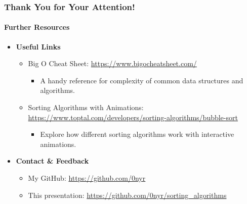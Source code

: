\documentclass[compress,12pt,bookmark]{beamer}
\begin{document}
\begin{frame}
    \frametitle{Thank You for Your Attention!}
    \framesubtitle{Further Resources}

    \begin{itemize}
        \item \textbf{Useful Links}
              \begin{itemize}
                  \item Big O Cheat Sheet: \url{https://www.bigocheatsheet.com/}
                        \begin{itemize}
                            \item A handy reference for complexity of common data structures and algorithms.
                        \end{itemize}
                  \item Sorting Algorithms with Animations: \url{https://www.toptal.com/developers/sorting-algorithms/bubble-sort}
                        \begin{itemize}
                            \item Explore how different sorting algorithms work with interactive animations.
                        \end{itemize}
              \end{itemize}
        \item \textbf{Contact \& Feedback}
              \begin{itemize}
                  \item My GitHub: \url{https://github.com/0nyr}
                  \item This presentation: \url{https://github.com/0nyr/sorting_algorithms}
              \end{itemize}
    \end{itemize}

\end{frame}
\end{document}
